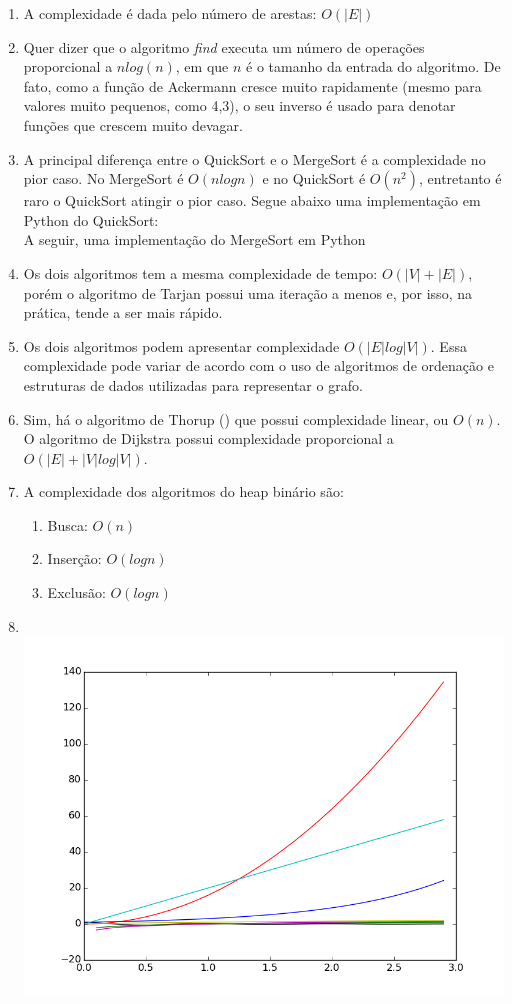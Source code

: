 \documentclass[11pt]{article}
\begin{document}
\begin{enumerate}
    \item A complexidade é dada pelo número de arestas: $O(|E|)$
    \item Quer dizer que o algoritmo \textit{find} executa um número de
operações proporcional a $n log(n)$, em que $n$ é o tamanho da entrada do
algoritmo. De fato, como a função de Ackermann cresce muito rapidamente (mesmo
para valores muito pequenos, como 4,3), o seu inverso é usado para denotar
funções que crescem muito devagar.
    \item A principal diferença entre o QuickSort e o MergeSort é a
complexidade no pior caso. No MergeSort é $O(nlogn)$ e no QuickSort é $O(n^2)$,
entretanto é raro o QuickSort atingir o pior caso. Segue abaixo uma
implementação em Python do QuickSort: \hfill \\
    
    A seguir, uma implementação do MergeSort em Python
    
    \item Os dois algoritmos tem a mesma complexidade de tempo: $O(|V|+|E|)$,
porém o algoritmo de Tarjan possui uma iteração a menos e, por isso, na
prática, tende a ser mais rápido.
    \item Os dois algoritmos podem apresentar complexidade $O(|E|log|V|)$. Essa
complexidade pode variar de acordo com o uso de algoritmos de ordenação e
estruturas de dados utilizadas para representar o grafo.
    \item Sim, há o algoritmo de Thorup (\cite{thorup}) que possui complexidade linear, ou $O(n)$. O algoritmo de Dijkstra possui complexidade proporcional a $O(|E| + |V|log|V|)$.
    \item A complexidade dos algoritmos do heap binário são:
        \begin{enumerate}
            \item Busca: $O(n)$
            \item Inserção: $O(logn)$
            \item Exclusão: $O(logn)$
        \end{enumerate}    
    \item \hfill \\
        \includegraphics[scale=0.5]{plot.png}

\end{enumerate}
\end{document}

